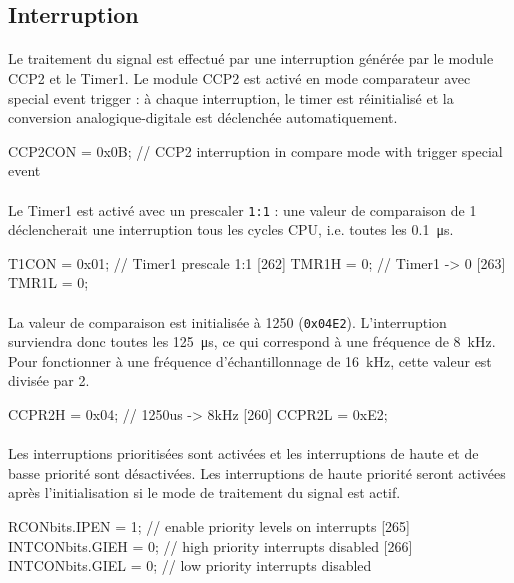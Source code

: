 \documentclass{article}
\begin{document}
    \subsection{Interruption}
    \label{section:interruption}
    \paragraph{}
    Le traitement du signal est effectué par une interruption générée par le module CCP2 et le Timer1. Le module CCP2 est activé en mode comparateur avec special event trigger : à chaque interruption, le timer est réinitialisé et la conversion analogique-digitale est déclenchée automatiquement.
    \begin{verbatimtab}
    [258]    CCP2CON = 0x0B;         // CCP2 interruption in compare mode
                                             with trigger special event
    \end{verbatimtab}

    \paragraph{}
    Le Timer1 est activé avec un prescaler \texttt{1:1} : une valeur de comparaison de 1 déclencherait une interruption tous les cycles CPU, i.e. toutes les \SI{0.1}{\micro\second}.
    \begin{verbatimtab}
    [261]    T1CON   = 0x01;         // Timer1 prescale 1:1
    [262]    TMR1H   = 0;            // Timer1 -> 0
    [263]    TMR1L   = 0;
    \end{verbatimtab}

    \paragraph{}
    La valeur de comparaison est initialisée à 1250 (\texttt{0x04E2}). L'interruption surviendra donc toutes les \SI{125}{\micro\second}, ce qui correspond à une fréquence de \SI{8}{\kilo\hertz}. Pour fonctionner à une fréquence d'échantillonnage de \SI{16}{\kilo\hertz}, cette valeur est divisée par 2.
    \begin{verbatimtab}
    [259]    CCPR2H  = 0x04;         // 1250us -> 8kHz
    [260]    CCPR2L  = 0xE2;
    \end{verbatimtab}

    \paragraph{}
    Les interruptions prioritisées sont activées et les interruptions de haute et de basse priorité sont désactivées. Les interruptions de haute priorité seront activées après l'initialisation si le mode de traitement du signal est actif.
    \begin{verbatimtab}
    [264]    RCONbits.IPEN   = 1;    // enable priority levels on interrupts
    [265]    INTCONbits.GIEH = 0;    // high priority interrupts disabled
    [266]    INTCONbits.GIEL = 0;    // low priority interrupts disabled
    \end{verbatimtab}
\end{document}
